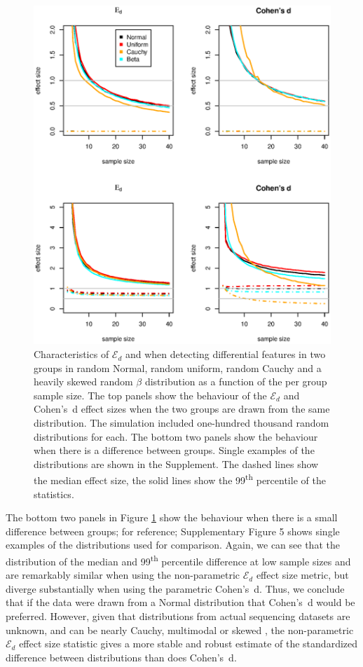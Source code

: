 \documentclass{bioinfo}
\begin{document}
\begin{figure}[tpb]
\centerline{\includegraphics[scale=0.50]{F1-null-model.eps}}
\caption{Characteristics of $\mathcal{E}_{d}$ and when detecting differential features in two groups in random Normal, random uniform, random Cauchy and a heavily skewed random $\beta$ distribution as a function of the per group sample size. The top panels show the behaviour of the $\mathcal{E}_{d}$ and Cohen's~d effect sizes when the two groups are drawn from the same distribution. The simulation included one-hundred thousand random distributions for each. The bottom two panels show the behaviour when there is a difference between groups. Single examples of the distributions are shown in the Supplement. The dashed lines show the median effect size, the solid lines show the 99\textsuperscript{th} percentile of the statistics.  }
\label{fig:01}
\end{figure}

The bottom two panels in Figure \ref{fig:01} show the behaviour when there is a small difference between groups; for reference; Supplementary Figure 5 shows single examples of the distributions used  for comparison.  Again, we can see that the distribution of the median and 99\textsuperscript{th} percentile difference at low sample sizes and are remarkably similar when using the  non-parametric $\mathcal{E}_{d}$ effect size metric, but diverge substantially when using the parametric Cohen's~d. Thus, we conclude that if the data were drawn from a Normal distribution that Cohen's~d would be preferred. However, given that distributions from actual sequencing datasets are unknown, and can be nearly Cauchy, multimodal or skewed \citep{fernandes:2013},  the non-parametric $\mathcal{E}_{d}$ effect size statistic gives a more stable and robust estimate of the standardized difference between distributions than does Cohen's~d.
\end{document}
